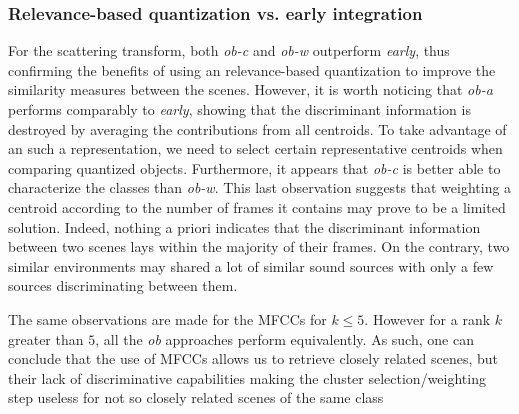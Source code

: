 \documentclass[journal]{IEEEtran}
\makeatletter
\newcommand*{\vs}{vs.\@\xspace}
\newcommand{\ja}[1]{\textcolor{magenta}{Joakim : #1}}
\makeatother
\begin{document}
\subsubsection*{Relevance-based quantization \vs early integration}

For the scattering transform, both \emph{ob-c} and \emph{ob-w} outperform \emph{early}, thus confirming the benefits of using an relevance-based quantization to improve the similarity measures between the scenes. However, it is worth noticing that \emph{ob-a} performs comparably to \emph{early}, showing that the discriminant information is destroyed by averaging the contributions from all centroids. To take advantage of an such a representation, we need to select certain representative centroids when comparing quantized objects. Furthermore, it appears that \emph{ob-c} is better able to characterize the classes than \emph{ob-w}. This last observation suggests that weighting a centroid according to the number of frames it contains may prove to be a limited solution. Indeed, nothing a priori indicates that the discriminant information between two scenes lays within the majority of their frames. On the contrary, two similar environments may shared a lot of similar sound sources with only a few sources discriminating between them.

The same observations are made for the MFCCs for $k\leq5$. However for a rank $k$ greater than $5$, all the \emph{ob} approaches perform equivalently. As such, one can conclude that the use of MFCCs allows us to retrieve closely related scenes, but their lack of discriminative capabilities making the cluster selection/weighting step useless for not so closely related scenes of the same class

	
\end{document}
